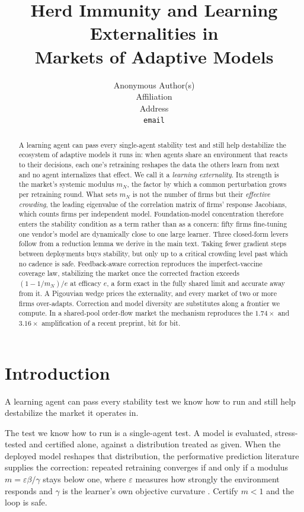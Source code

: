\documentclass{article}
\title{Herd Immunity and Learning Externalities in\\ Markets of Adaptive Models}
\author{%
  Anonymous Author(s) \\
  Affiliation \\
  Address \\
  \texttt{email} \\
}
\theoremstyle{plain}
\theoremstyle{definition}
\newcommand{\mN}{m_N}
\begin{document}
\maketitle

\begin{abstract}
A learning agent can pass every single-agent stability test and still help destabilize the ecosystem of adaptive models it runs in: when agents share an environment that reacts to their decisions, each one's retraining reshapes the data the others learn from next and no agent internalizes that effect. We call it a \emph{learning externality}. Its strength is the market's systemic modulus $\mN$, the factor by which a common perturbation grows per retraining round. What sets $\mN$ is not the number of firms but their \emph{effective crowding}, the leading eigenvalue of the correlation matrix of firms' response Jacobians, which counts firms per independent model. Foundation-model concentration therefore enters the stability condition as a term rather than as a concern: fifty firms fine-tuning one vendor's model are dynamically close to one large learner. Three closed-form levers follow from a reduction lemma we derive in the main text. Taking fewer gradient steps between deployments buys stability, but only up to a critical crowding level past which no cadence is safe. Feedback-aware correction reproduces the imperfect-vaccine coverage law, stabilizing the market once the corrected fraction exceeds $(1-1/\mN)/e$ at efficacy $e$, a form exact in the fully shared limit and accurate away from it. A Pigouvian wedge prices the externality, and every market of two or more firms over-adapts. Correction and model diversity are substitutes along a frontier we compute. In a shared-pool order-flow market the mechanism reproduces the $1.74\times$ and $3.16\times$ amplification of a recent preprint, bit for bit.
\end{abstract}

\section{Introduction}

A learning agent can pass every stability test we know how to run and still help destabilize the market it operates in.

The test we know how to run is a single-agent test. A model is evaluated, stress-tested and certified alone, against a distribution treated as given. When the deployed model reshapes that distribution, the performative prediction literature supplies the correction: repeated retraining converges if and only if a modulus $m = \varepsilon\beta/\gamma$ stays below one, where $\varepsilon$ measures how strongly the environment responds and $\gamma$ is the learner's own objective curvature \citep{perdomo2020}. Certify $m<1$ and the loop is safe.
\end{document}
